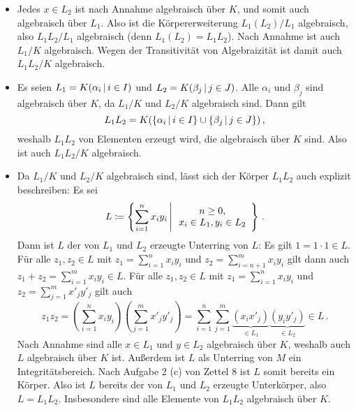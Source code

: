 \begin{itemize}
  \item
    Jedes $x \in L_2$ ist nach Annahme algebraisch über $K$, und somit auch algebraisch über $L_1$.
    Also ist die Körpererweiterung $L_1(L_2)/L_1$ algebraisch, also $L_1 L_2 / L_1$ algebraisch (denn $L_1(L_2) = L_1 L_2$).
    Nach Annahme ist auch $L_1/K$ algebraisch.
    Wegen der Transitivität von Algebraizität ist damit auch $L_1 L_2 / K$ algebraisch.
  \item
    Es seien $L_1 = K(\alpha_i \suchthat i \in I)$ und $L_2 = K(\beta_j \suchthat j \in J)$.
    Alle $\alpha_i$ und $\beta_j$ sind algebraisch über $K$, da $L_1/K$ und $L_2/K$ algebraisch sind.
    Dann gilt
    \[
        L_1 L_2
      = K(\{\alpha_i \suchthat i \in I\} \cup \{\beta_j \suchthat j \in J\}) \,,
    \]
    weshalb $L_1 L_2$ von Elementen erzeugt wird, die algebraisch über $K$ sind.
    Also ist auch $L_1 L_2 / K$ algebraisch.
  \item
    Da $L_1/K$ und $L_2/K$ algebraisch sind, lässt sich der Körper $L_1 L_2$ auch explizit beschreiben:
    Es sei
    \[
              L
      \define \left\{
                \sum_{i=1}^n x_i y_i
              \suchthat*
                \begin{array}{c}
                  n \geq 0,
                \\
                  x_i \in L_1,
                  y_i \in L_2
                \end{array}
              \right\} \,.
    \]
    Dann ist $L$ der von $L_1$ und $L_2$ erzeugte Unterring von $L$:
    Es gilt $1 = 1 \cdot 1 \in L$.
    Für alle $z_1, z_2 \in L$ mit $z_1 = \sum_{i=1}^n x_i y_i$ und $z_2 = \sum_{i=n+1}^m x_i y_i$ gilt dann auch $z_1 + z_2 = \sum_{i=1}^m x_i y_i \in L$.
    Für alle $z_1, z_2 \in L$ mit $z_1 = \sum_{i=1}^n x_i y_i$ und $z_2 = \sum_{j=1}^m x'_j y'_j$ gilt auch
    \[
          z_1 z_2
      =   \left(
            \sum_{i=1}^n x_i y_i
          \right)
          \left(
            \sum_{j=1}^m x'_j y'_j
          \right)
      =   \sum_{i=1}^n \sum_{j=1}^m \underbrace{(x_i x'_j)}_{\in L_1} \underbrace{(y_i y'_j)}_{\in L_2}
      \in L \,.
    \]
    Nach Annahme sind alle $x \in L_1$ und $y \in L_2$ algebraisch über $K$, weshalb auch $L$ algebraisch über $K$ ist.
    Außerdem ist $L$ als Unterring von $M$ ein Integritätsbereich.
    Nach Aufgabe 2 (c) von Zettel 8 ist $L$ somit bereits ein Körper.
    Also ist $L$ bereits der von $L_1$ und $L_2$ erzeugte Unterkörper, also $L = L_1 L_2$.
    Insbesondere sind alle Elemente von $L_1 L_2$ algebraisch über $K$.
\end{itemize}

